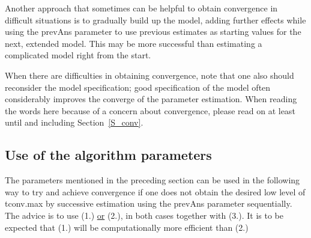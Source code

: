 \documentclass[a4paper,fleqn,11pt]{article}
\newcommand{\+}{\, + \,}
\newcommand{\sfn}[1]{\textsf{#1}}
\begin{document}
Another approach that sometimes can be helpful to obtain convergence in difficult
situations is to gradually build up the model, adding further effects
while using the \sfn{prevAns} parameter to use previous estimates as starting
values for the next, extended model. This may be more successful than
estimating a complicated model right from the start.

When there are difficulties in obtaining convergence, note that one also
should reconsider the model specification; good specification of the model often
considerably improves the converge of the parameter estimation.
When reading the words here because of a concern about convergence,
please read on at least until and including Section~\ref{S_conv}.

\subsection{Use of the algorithm parameters}

The parameters mentioned in the preceding section can be used in the following way
to try and achieve convergence if one does not obtain the desired low level
of \sfn{tconv.max} by successive estimation using the \sfn{prevAns}
parameter sequentially.
The advice is to use (1.) \underline{or} (2.), in both cases together with (3.).
It is to be expected that (1.) will be computationally more efficient than (2.)
\end{document}
